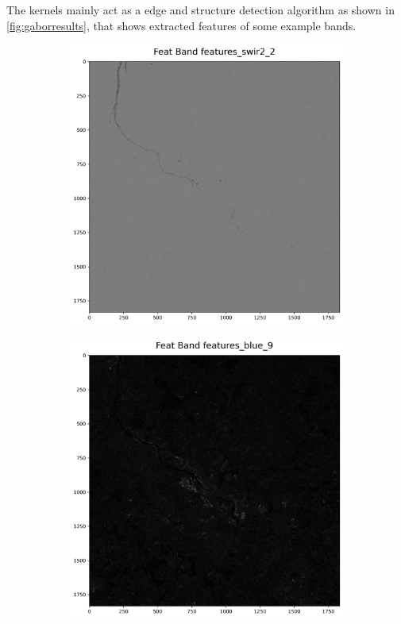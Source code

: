 \documentclass[12pt,a4paper, english]{article}
\begin{document}
    The kernels mainly act as a edge and structure detection algorithm as shown in \cref{fig:gaborresults}, that shows extracted features of some example bands.
  \begin{figure}[!htbp]
      \centering
      \begin{subfigure}[b]{0.3\textwidth}
        \includegraphics[width=\textwidth]{img/Features_swir1.png}
      \end{subfigure}
      \begin{subfigure}[b]{0.3\textwidth}
        \includegraphics[width=\textwidth]{img/Features_blue3.png}

\end{subfigure}
\end{figure}
\end{document}
